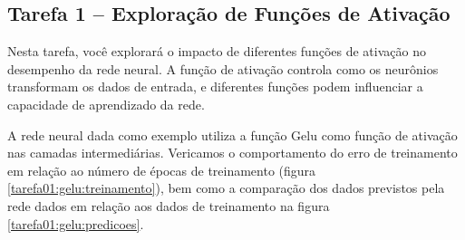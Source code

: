 \subsection{Tarefa 1 -- Exploração de Funções de Ativação}

\begin{comandoquestao}
   Nesta tarefa, você explorará o impacto de diferentes funções de ativação no desempenho da rede neural. A função de ativação controla como os neurônios transformam os dados de entrada, e diferentes funções podem influenciar a capacidade de aprendizado da rede.
\end{comandoquestao}

A rede neural dada como exemplo utiliza a função Gelu como função de ativação nas camadas intermediárias. Vericamos o comportamento do erro de treinamento em relação ao número de épocas de treinamento (figura \ref{tarefa01:gelu:treinamento}), bem como a comparação dos dados previstos pela rede dados em relação aos dados de treinamento na figura \ref{tarefa01:gelu:predicoes}.

